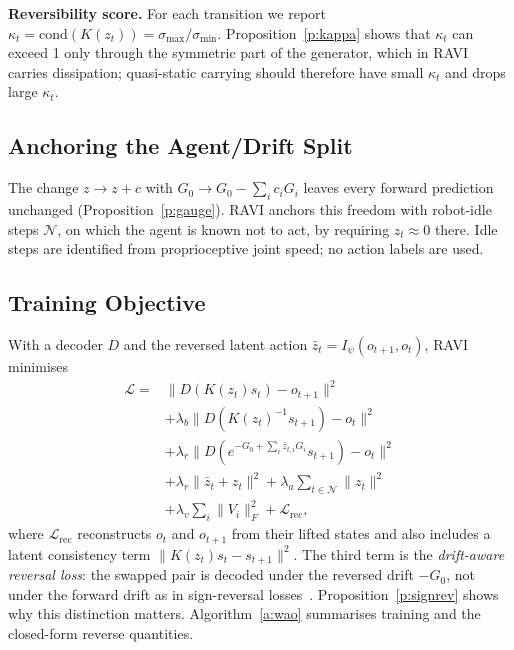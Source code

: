 \documentclass{jcse}
\newcommand{\method}{RAVI}
\newcommand{\zb}{\bar{z}}
\newcommand{\cond}{\mathrm{cond}}
\begin{document}
\textbf{Reversibility score.} For each transition we report $\kappa_t=\cond(K(z_t))=\sigma_{\max}/\sigma_{\min}$.
Proposition~\ref{p:kappa} shows that $\kappa_t$ can exceed 1 only through the symmetric part of the generator, which in {\method} carries dissipation; quasi-static carrying should therefore have small $\kappa_t$ and drops large $\kappa_t$.

\subsection{Anchoring the Agent/Drift Split}
The change $z\to z+c$ with $G_0\to G_0-\sum_ic_iG_i$ leaves every forward prediction unchanged (Proposition~\ref{p:gauge}).
{\method} anchors this freedom with robot-idle steps $\mathcal{N}$, on which the agent is known not to act, by requiring $z_t\approx0$ there.
Idle steps are identified from proprioceptive joint speed; no action labels are used.

\subsection{Training Objective}
With a decoder $D$ and the reversed latent action $\zb_t=I_\psi(o_{t+1},o_t)$, {\method} minimises
\begin{align}
\mathcal{L}={}&\|D(K(z_t)s_t)-o_{t+1}\|^2\nonumber\\
&+\lambda_b\|D(K(z_t)^{-1}s_{t+1})-o_t\|^2\nonumber\\
&+\lambda_r\|D(e^{-G_0+\sum_i\zb_{t,i}G_i}s_{t+1})-o_t\|^2\nonumber\\
&+\lambda_r\|\zb_t+z_t\|^2+\lambda_a\textstyle\sum_{t\in\mathcal{N}}\|z_t\|^2\nonumber\\
&+\lambda_v\textstyle\sum_i\|V_i\|_F^2+\mathcal{L}_{\mathrm{rec}},
\label{e:loss}
\end{align}
where $\mathcal{L}_{\mathrm{rec}}$ reconstructs $o_t$ and $o_{t+1}$ from their lifted states and also includes a latent consistency term $\|K(z_t)s_t-s_{t+1}\|^2$.
The third term is the \emph{drift-aware reversal loss}: the swapped pair is decoded under the reversed drift $-G_0$, not under the forward drift as in sign-reversal losses~\cite{tang2026alam}.
Proposition~\ref{p:signrev} shows why this distinction matters.
Algorithm~\ref{a:wao} summarises training and the closed-form reverse quantities.
\end{document}
